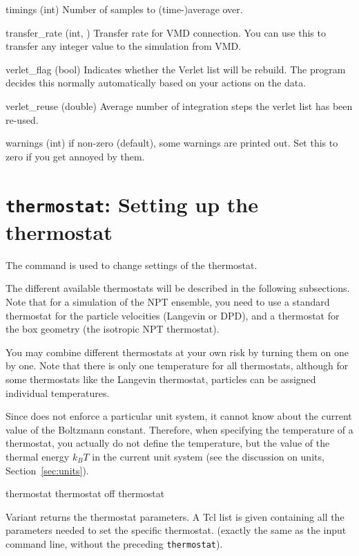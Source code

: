 \begin{globvar}
\item[timings] (int) Number of samples to (time-)average over.
\item[transfer_rate] (int, \ro) Transfer rate for VMD connection. You
  can use this to transfer any integer value to the simulation from
  VMD.
\item[verlet_flag] (bool) Indicates whether the Verlet list will be
  rebuild. The program decides this normally automatically based on
  your actions on the data.
\item[verlet_reuse] (double) Average number of integration steps the
  verlet list has been re-used.
\item[warnings] (int) if non-zero (default), some warnings are printed out. Set this to zero if you get annoyed by them.
\end{globvar}

\section{\texttt{thermostat}: Setting up the thermostat}
\label{sec:thermostat}

The  command is used to change settings of the
thermostat.  

The different available thermostats will be described in the following
subsections. Note that for a simulation of the NPT ensemble, you need
to use a standard thermostat for the particle velocities (\eg Langevin
or DPD), and a thermostat for the box geometry (\eg the isotropic NPT
thermostat).

You may combine different thermostats at your own risk by turning them
on one by one. Note that there is only one temperature for all
thermostats, although for some thermostats like the Langevin thermostat,
particles can be assigned individual temperatures.

Since \es{} does not enforce a particular unit system, it cannot know
about the current value of the Boltzmann constant. Therefore, when
specifying the temperature of a thermostat, you actually do not define
the temperature, but the value of the thermal energy $k_B T$ in the
current unit system (see the discussion on units, Section~\ref{sec:units}).

\begin{essyntax}
   thermostat
   thermostat off
   thermostat 
\end{essyntax}

Variant  returns the thermostat parameters. A Tcl list is
given containing all the parameters needed to set the specific
thermostat. (exactly the same as the input command line, without the
preceding \texttt{thermostat}).

